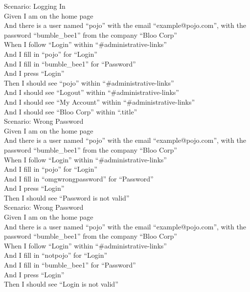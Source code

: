 \documentclass[12pt]{article}
\begin{document}
Scenario: Logging In \\
  Given I am on the home page \\
  And there is a user named ``pojo'' with the email ``example@pojo.com'', with the password ``bumble\_bee1'' from the company ``Bloo Corp'' \\
  When I follow ``Login'' within ``\#administrative-links'' \\
  And I fill in ``pojo'' for ``Login'' \\
  And I fill in ``bumble\_bee1'' for ``Password'' \\
  And I press ``Login'' \\
  Then I should see ``pojo'' within ``\#administrative-links'' \\
  And I should see ``Logout'' within ``\#administrative-links'' \\
  And I should see ``My Account'' within ``\#administrative-links'' \\
  And I should see ``Bloo Corp'' within ``.title'' \\

Scenario: Wrong Password \\
  Given I am on the home page \\
  And there is a user named ``pojo'' with the email ``example@pojo.com'', with the password ``bumble\_bee1'' from the company ``Bloo Corp'' \\
  When I follow ``Login'' within ``\#administrative-links'' \\
  And I fill in ``pojo'' for ``Login'' \\
  And I fill in ``omgwrongpassword'' for ``Password'' \\
  And I press ``Login'' \\
  Then I should see ``Password is not valid'' \\

Scenario: Wrong Password \\
  Given I am on the home page \\
  And there is a user named ``pojo'' with the email ``example@pojo.com'', with the password ``bumble\_bee1'' from the company ``Bloo Corp'' \\
  When I follow ``Login'' within ``\#administrative-links'' \\
  And I fill in ``notpojo'' for ``Login'' \\
  And I fill in ``bumble\_bee1'' for ``Password'' \\
  And I press ``Login'' \\
  Then I should see ``Login is not valid'' \\
\end{document}
